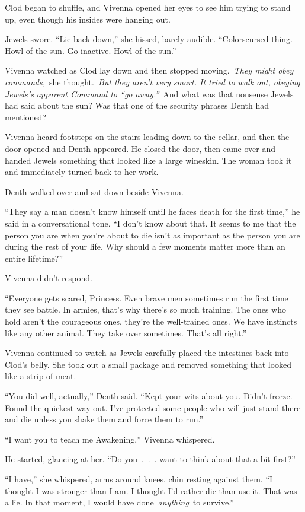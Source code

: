 Clod began to shuffle, and Vivenna opened her eyes to see him trying to stand up, even though his insides were hanging out.

Jewels swore. “Lie back down,” she hissed, barely audible. “Colorscursed thing. Howl of the sun. Go inactive. Howl of the sun.”

Vivenna watched as Clod lay down and then stopped moving.~\textit{They might obey commands,}~she thought.~\textit{But they aren’t very smart. It tried to walk out, obeying Jewels’s apparent Command to “go away.”}~And what was that nonsense Jewels had said about the sun? Was that one of the security phrases Denth had mentioned?

Vivenna heard footsteps on the stairs leading down to the cellar, and then the door opened and Denth appeared. He closed the door, then came over and handed Jewels something that looked like a large wineskin. The woman took it and immediately turned back to her work.

Denth walked over and sat down beside Vivenna.

“They say a man doesn’t know himself until he faces death for the first time,” he said in a conversational tone. “I don’t know about that. It seems to me that the person you are when you’re about to die isn’t as important as the person you are during the rest of your life. Why should a few moments matter more than an entire lifetime?”

Vivenna didn’t respond.

“Everyone gets scared, Princess. Even brave men sometimes run the first time they see battle. In armies, that’s why there’s so much training. The ones who hold aren’t the courageous ones, they’re the well-trained ones. We have instincts like any other animal. They take over sometimes. That’s all right.”

Vivenna continued to watch as Jewels carefully placed the intestines back into Clod’s belly. She took out a small package and removed something that looked like a strip of meat.

“You did well, actually,” Denth said. “Kept your wits about you. Didn’t freeze. Found the quickest way out. I’ve protected some people who will just stand there and die unless you shake them and force them to run.”

“I want you to teach me Awakening,” Vivenna whispered.

He started, glancing at her. “Do you~.~.~. want to think about that a bit first?”

“I have,” she whispered, arms around knees, chin resting against them. “I thought I was stronger than I am. I thought I’d rather die than use it. That was a lie. In that moment, I would have done~\textit{anything}~to survive.”

